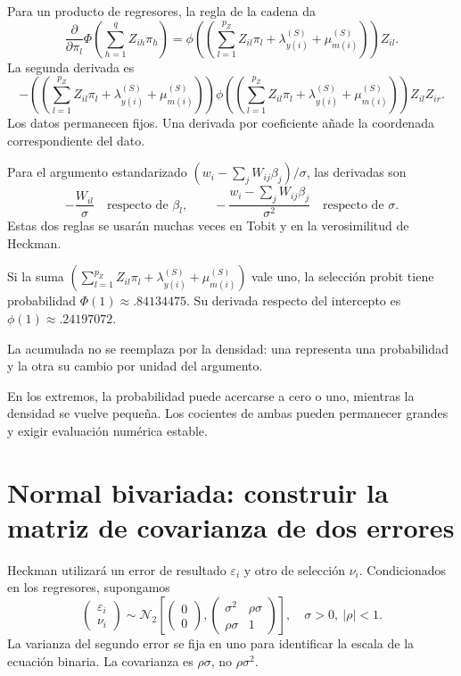 \documentclass[11pt,a4paper]{article}
\begin{document}
Para un producto de regresores,
la regla de la cadena da
\[
\frac{\partial}{\partial\pi_l}
\Phi\left(\sum_{h=1}^qZ_{ih}\pi_h\right)
=\phi\left(\left(\sum_{l=1}^{p_Z}Z_{il}\pi_l+\lambda_{y(i)}^{(S)}+\mu_{m(i)}^{(S)}\right)\right)Z_{il}.
\]
La segunda derivada es
\[
-\left(\left(\sum_{l=1}^{p_Z}Z_{il}\pi_l+\lambda_{y(i)}^{(S)}+\mu_{m(i)}^{(S)}\right)\right)
\phi\left(\left(\sum_{l=1}^{p_Z}Z_{il}\pi_l+\lambda_{y(i)}^{(S)}+\mu_{m(i)}^{(S)}\right)\right)
Z_{il}Z_{ir}.
\]
Los datos permanecen fijos.
Una derivada por coeficiente añade
la coordenada correspondiente del dato.

Para el argumento estandarizado
\((w_i-\sum_jW_{ij}\beta_j)/\sigma\),
las derivadas son
\[
-\frac{W_{il}}{\sigma}
\quad\text{respecto de }\beta_l,\qquad
-\frac{w_i-\sum_jW_{ij}\beta_j}{\sigma^2}
\quad\text{respecto de }\sigma.
\]
Estas dos reglas se usarán muchas veces
en Tobit y en la verosimilitud de Heckman.

\begin{ejemplo}
Si la suma \(\left(\sum_{l=1}^{p_Z}Z_{il}\pi_l+\lambda_{y(i)}^{(S)}+\mu_{m(i)}^{(S)}\right)\)
vale uno, la selección probit tiene
probabilidad \(\Phi(1)\approx.84134475\).
Su derivada respecto del intercepto
es \(\phi(1)\approx.24197072\).
\end{ejemplo}
La acumulada no se reemplaza por
la densidad: una representa una
probabilidad y la otra su cambio
por unidad del argumento.

En los extremos, la probabilidad
puede acercarse a cero o uno,
mientras la densidad se vuelve pequeña.
Los cocientes de ambas pueden
permanecer grandes y exigir
evaluación numérica estable.


\clearpage
\section{Normal bivariada: construir la matriz de covarianza de dos errores}

Heckman utilizará un error de resultado
\(\varepsilon_i\) y otro de selección \(\nu_i\).
Condicionados en los regresores, supongamos
\[
\begin{pmatrix}\varepsilon_i\\\nu_i\end{pmatrix}
\sim\mathcal N_2\left[
\begin{pmatrix}0\\0\end{pmatrix},
\begin{pmatrix}\sigma^2&\rho\sigma\\\rho\sigma&1\end{pmatrix}
\right],
\quad \sigma>0,\ |\rho|<1.
\]
La varianza del segundo error se fija en uno
para identificar la escala de la ecuación binaria.
La covarianza es \(\rho\sigma\),
no \(\rho\sigma^2\).
\end{document}

